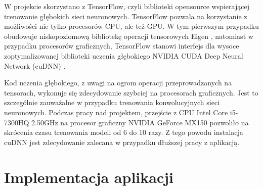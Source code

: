 W projekcie skorzystano z TensorFlow, czyli biblioteki opensource wspierającej trenowanie głębokich sieci neuronowych. TensorFlow pozwala na korzystanie z możliwości nie tylko procesorów CPU, ale też GPU. W tym pierwszym przypadku obudowuje niskopoziomową bibliotekę operacji tensorowych Eigen \cite{Eigen}, natomiast w przypadku procesorów graficznych, TensorFlow stanowi interfejs dla wysoce zoptymalizowanej biblioteki uczenia głębokiego NVIDIA CUDA Deep Neural Network (cuDNN) \cite{cuDNN}.

Kod uczenia głębokiego, z uwagi na ogrom operacji przeprowadzanych na tensorach, wykonuje się zdecydowanie szybciej na procesorach graficznych. Jest to szczególnie zauważalne  w przypadku trenowania konwolucyjnych sieci neuronowych. Podczas pracy nad projektem, przejście z CPU Intel Core i5-7300HQ 2.50GHz na procesor graficzny NVIDIA GeForce MX150 pozwoliło na skrócenia czasu trenowania modeli od 6 do 10 razy. Z tego powodu instalacja cuDNN jest zdecydowanie zalecana w przypadku dłuższej pracy z aplikacją.


\section{Implementacja aplikacji}

